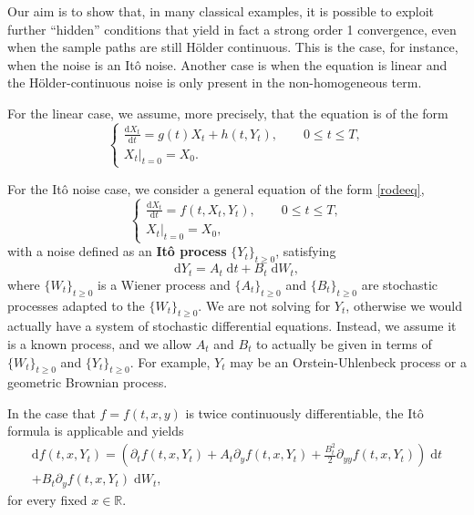 \documentclass[reqno,12pt]{amsart}
\theoremstyle{plain}%
\theoremstyle{definition}
\begin{document}
Our aim is to show that, in many classical examples, it is possible to exploit further ``hidden'' conditions that yield in fact a strong order 1 convergence, even when the sample paths are still H\"older continuous. This is the case, for instance, when the noise is an It\^o noise. Another case is when the equation is linear and the H\"older-continuous noise is only present in the non-homogeneous term.

For the linear case, we assume, more precisely, that the equation is of the form
\begin{equation}
    \label{linearrodeeq}
    \begin{cases}
        \displaystyle \frac{\mathrm{d}X_t}{\mathrm{d} t} = g(t) X_t + h(t, Y_t), \qquad 0 \leq t \leq T, \\
        \left. X_t \right|_{t = 0} = X_0.
    \end{cases}
\end{equation}

For the It\^o noise case, we consider a general equation of the form \eqref{rodeeq},
\begin{equation}
    \begin{cases}
      \displaystyle \frac{\mathrm{d}X_t}{\mathrm{d} t} = f(t, X_t, Y_t), \qquad 0 \leq t \leq T, \\
      \left. X_t \right|_{t = 0} = X_0,
    \end{cases}
  \end{equation}
with a noise defined as an \textbf{It\^o process} $\{Y_t\}_{t\geq 0}$, satisfying
\begin{equation}
  \label{itoprocess}
  \mathrm{d}Y_t = A_t \;\mathrm{d}t + B_t \;\mathrm{d}W_t,
\end{equation}
where $\{W_t\}_{t\geq 0}$ is a Wiener process and $\{A_t\}_{t \geq 0}$ and $\{B_t\}_{t \geq 0}$ are stochastic processes adapted to the $\{W_t\}_{t\geq 0}$. We are not solving for $Y_t$, otherwise we would actually have a system of stochastic differential equations. Instead, we assume it is a known process, and we allow $A_t$ and $B_t$ to actually be given in terms of $\{W_t\}_{t\geq 0}$ and $\{Y_t\}_{t\geq 0}$. For example, $Y_t$ may be an Orstein-Uhlenbeck process or a geometric Brownian process.

In the case that $f=f(t, x, y)$ is twice continuously differentiable, the It\^o formula is applicable and yields
\begin{multline}
  \label{itoformula}
  \mathrm{d}f(t, x, Y_t) = \left(\partial_t f(t, x, Y_t) + A_t \partial_y f(t, x, Y_t)  + \frac{B_t^2}{2}\partial_{yy}f(t, x, Y_t) \right) \;\mathrm{d}t \\ + B_t \partial_y f(t, x, Y_t)\;\mathrm{d}W_t,
\end{multline}
for every fixed $x\in \mathbb{R}$.
\end{document}
